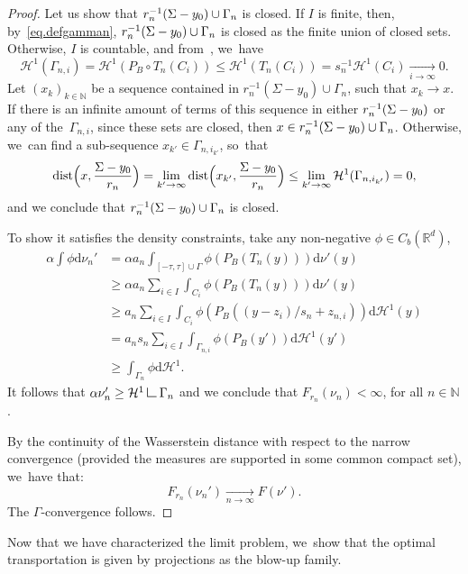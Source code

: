 \documentclass[JEP,XML,SOM,Unicode,NoFloatCountersInSection,published]{cedram}
\theoremstyle{definition}
\newcommand\LM[1]{\hbox{\vrule width.5pt \vbox to#1pt{\vfill \hrule width#1pt height.5pt}}}
\newcommand\LL{{\mathchoice {\>\LM7\>}{\>\LM7\>}{\,\LM5\,}{\,\LM{3.35}\,}}}
\newcommand{\mres}{\LL}
\newcommand\cH{\mathcal{H}}
\newcommand{\RR}{\mathbb{R}}
\DeclareMathOperator{\dist}{dist}
\newcommand\dd{\mathrm{d}}
\begin{document}
\begin{proof}
Let us show that $r_n^{-1}(\Sigma -\nobreak y_0) \cup\nobreak \Gamma_n$ is closed. If $I$ is finite, then, by~\eqref{eq.defgamman}, $r_n^{-1}(\Sigma -\nobreak y_0) \cup\nobreak \Gamma_n$ is closed as the finite union of closed sets.
Otherwise, $I$ is countable, and from~\cite[Lem.\,2.6]{paolini2013existence}, we~have
\[
\cH^1(\Gamma_{n,i})
=
\cH^1(P_B\circ T_n(C_i))
\le
\cH^1(T_n(C_i))
=
s_n^{-1} \cH^1(C_i)
\xrightarrow[i \to \infty]{} 0.
\]
Let ${\left(x_k\right)}_{k \in \mathbb{N}}$ be a sequence contained in $r_n^{-1}(\Sigma - y_0) \cup \Gamma_n$, such that $x_k \to x$. If there is an infinite amount of terms of this sequence in either $r_n^{-1}(\Sigma -\nobreak y_0)$ or any of the~$\Gamma_{n,i}$, since these sets are closed, then $x \in r_n^{-1}(\Sigma -\nobreak y_0) \cup\nobreak \Gamma_n$. Otherwise, we~can find a sub-sequence $x_{k'} \in \Gamma_{n, i_{k'}}$, so~that
\[
\dist\Bigl(
x, \frac{\Sigma - y_0}{r_n}
\Bigr)
=
\lim_{k' \to \infty}
\dist \Bigl(
x_{k'}, \frac{\Sigma - y_0}{r_n}
\Bigr)
\le
\lim_{k' \to \infty} \cH^1(\Gamma_{n,i_{k'}}) = 0,
\]
and we conclude that $r_n^{-1}(\Sigma -\nobreak y_0) \cup\nobreak \Gamma_n$ is closed.

To show it satisfies the density constraints, take any non-negative $\phi\in C_b(\RR^d)$,
\begin{align*}
\alpha\int\phi\dd \nu_n'
&= \alpha a_n\int_{[-\tau,\tau]\cup \Gamma}\phi\left(P_B(T_n(y))\right)\dd \nu'(y)\\
&\ge \alpha a_n\sum_{i\in I}\int_{C_{i}}\phi\left(P_B(T_n(y))\right)\dd \nu'(y)\\
&\ge a_n\sum_{i\in I}\int_{C_{i}}\phi\left(P_B((y-z_{i})/s_{n}+z_{n,i})\right)\dd \cH^{1}(y)\\
&= a_n s_{n}\sum_{i\in I}\int_{\Gamma_{n,i}}\phi\left(P_B(y')\right)\dd \cH^{1}(y')\\
&
\ge \int_{\Gamma_{n}} \phi \dd \cH^{1}.
\end{align*}
It follows that $\alpha \nu_n'\geq \cH^1\mres \Gamma_{n}$ and we conclude that $F_{r_n}(\nu_n) < \infty$, for all $n \in \mathbb{N}$.

By the continuity of the Wasserstein distance with
respect to the narrow convergence (provided the measures are supported in some common compact set), we~have that:
\[
F_{r_n}(\nu_n') \xrightarrow[n \to \infty]{} F(\nu').
\]
The $\Gamma$-convergence follows.
\end{proof}

Now that we have characterized the limit problem, we~show that the optimal transportation is given by projections as the blow-up family.
\end{document}
